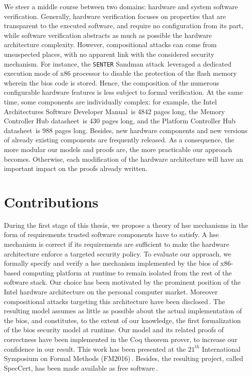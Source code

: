 We steer a middle course between two domains: hardware and system software
verification.
%
Generally, hardware verification focuses on properties that are transparent to
the executed software, and require no configuration from its part, while
software verification abstracts as much as possible the hardware architecture
complexity.
%
However, compositional attacks can come from unsuspected places, with no
apparent link with the considered security mechanism.
%
For instance, the \texttt{SENTER} Sandman attack\,\cite{kovah2015senter}
leveraged a dedicated execution mode of x86 processor to disable the protection
of the flash memory wherein the \ac{bios} code is stored.
%
Hence, the composition of the numerous configurable hardware features is less
subject to formal verification.
%
At the same time, some components are individually complex: for example, the
Intel Architectures Software Developer Manual\,\cite{intel2014manual} is 4842
pages long, the Memory Controller Hub datasheet\,\cite{intel2009mch} is 430
pages long, and the Platform Controller Hub datasheet\,\cite{intel2012pch} is
988 pages long.
%
Besides, new hardware components and new versions of already existing components
are frequently released.
%
As a consequence, the more modular our models and proofs are, the more
practicable our approach becomes.
%
Otherwise, each modification of the hardware architecture will have an important
impact on the proofs already written.

\section{Contributions}

During the first stage of this thesis, we propose a theory of \ac{hse}
mechanisms in the form of requirements trusted software components have to
satisfy.
%
A \ac{hse} mechanism is correct if its requirements are sufficient to make the
hardware architecture enforce a targeted security policy.
%
To evaluate our approach, we formally specify and verify a \ac{hse} mechanism
implemented by the \ac{bios} of x86-based computing platform at runtime to
remain isolated from the rest of the software stack.
%
Our choice has been motivated by the prominent position of the Intel hardware
architecture on the personal computer market.
%
Moreover compositional attacks targeting this architecture have been
disclosed\,\cite{duflot2009smram,wojtczuk2009smram,domas2015sinkhole,kallenberg2015racecondition,kovah2015senter}.
%
The resulting model assumes as little as possible about the actual
implementation of the \ac{bios}, and constitutes, to the extent of our
knowledge, the first formalization of the \ac{bios} security model at runtime.
%
Our model and its related proofs of correctness have been implemented in the Coq
theorem prover, to increase our confidence in our result.
%
This work has been presented at the $21^{th}$ International Symposium on Formal
Methods (FM2016)\,\cite{letan2016speccert}.
%
Besides, the resulting project, called SpecCert, has been made available as
free software\,\cite{letan2016speccertcode}.

